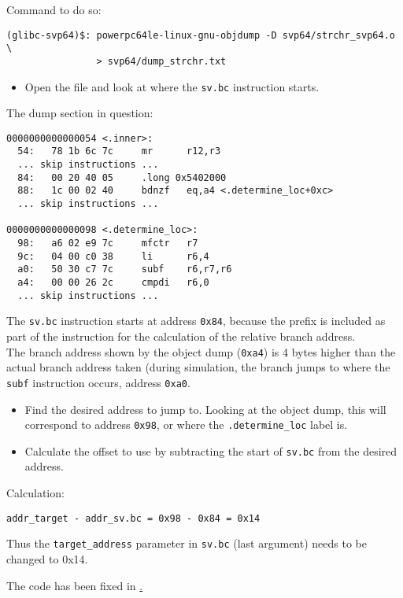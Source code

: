 Command to do so:

\begin{verbatim}
(glibc-svp64)$: powerpc64le-linux-gnu-objdump -D svp64/strchr_svp64.o \
                > svp64/dump_strchr.txt
\end{verbatim}


\begin{itemize}
  \item Open the file and look at where the \texttt{sv.bc} instruction starts.
\end{itemize}

The dump section in question:

\begin{verbatim}
0000000000000054 <.inner>:
  54:   78 1b 6c 7c     mr      r12,r3
  ... skip instructions ...
  84:   00 20 40 05     .long 0x5402000
  88:   1c 00 02 40     bdnzf   eq,a4 <.determine_loc+0xc>
  ... skip instructions ...

0000000000000098 <.determine_loc>:
  98:   a6 02 e9 7c     mfctr   r7
  9c:   04 00 c0 38     li      r6,4
  a0:   50 30 c7 7c     subf    r6,r7,r6
  a4:   00 00 26 2c     cmpdi   r6,0
  ... skip instructions ...
\end{verbatim}

The \texttt{sv.bc} instruction starts at address \texttt{0x84}, because
the prefix is included as part of the instruction for the calculation of the
relative branch address.\\

The branch address shown by the object dump (\texttt{0xa4}) is 4 bytes higher
than the actual branch address taken (during simulation, the branch jumps to
where the \texttt{subf} instruction occurs, address \texttt{0xa0}.


\begin{itemize}
  \item Find the desired address to jump to. Looking at the object dump,
  this will correspond to address \texttt{0x98}, or where the
\texttt{.determine\_loc} label is.
  \item Calculate the offset to use by subtracting the start of \texttt{sv.bc}
  from the desired address.
\end{itemize}

Calculation:

\begin{verbatim}
addr_target - addr_sv.bc = 0x98 - 0x84 = 0x14
\end{verbatim}

Thus the \texttt{target\_address} parameter in \texttt{sv.bc}
(last argument) needs to be changed to {0x14}.

The code has been fixed in
\href{https://github.com/ngisearchsvp64/glibc-svp64/commit/2d2c0f70dc5cca10a1c5d92d726406903f9e5b23}.
